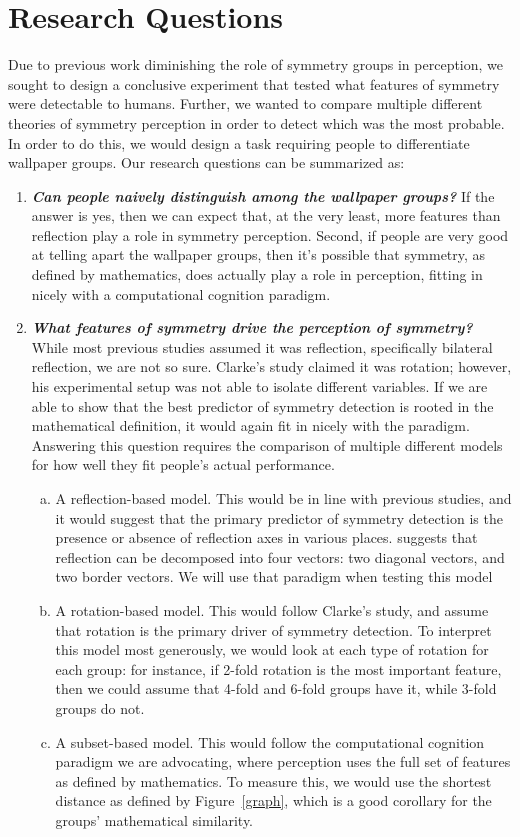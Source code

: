 \section{Research Questions}
Due to previous work diminishing the role of symmetry groups in perception, we sought to design a conclusive experiment that tested what features of symmetry were detectable to humans. Further, we wanted to compare multiple different theories of symmetry perception in order to detect which was the most probable. In order to do this, we would design a task requiring people to differentiate wallpaper groups. Our research questions can be summarized as:

\begin{enumerate}
\item {\textbf{\textit{Can people naively distinguish among the wallpaper groups?}} If the answer is yes, then we can expect that, at the very least, more features than reflection play a role in symmetry perception. Second, if people are very good at telling apart the wallpaper groups, then it's possible that symmetry, as defined by mathematics, does actually play a role in perception, fitting in nicely with a computational cognition paradigm.}
\item {\textbf{\textit{What features of symmetry drive the perception of symmetry?}} While most previous studies assumed it was reflection, specifically bilateral reflection, we are not so sure. Clarke's study claimed it was rotation; however, his experimental setup was not able to isolate different variables. If we are able to show that the best predictor of symmetry detection is rooted in the mathematical definition, it would again fit in nicely with the paradigm. Answering this question requires the comparison of multiple different models for how well they fit people's actual performance.}
\begin{enumerate}[a.]
\item {A reflection-based model. This would be in line with previous studies, and it would suggest that the primary predictor of symmetry detection is the presence or absence of reflection axes in various places. \citet{yanxibook} suggests that reflection can be decomposed into four vectors: two diagonal vectors, and two border vectors. We will use that paradigm when testing this model}
\item {A rotation-based model. This would follow Clarke's study, and assume that rotation is the primary driver of symmetry detection. To interpret this model most generously, we would look at each type of rotation for each group: for instance, if 2-fold rotation is the most important feature, then we could assume that 4-fold and 6-fold groups have it, while 3-fold groups do not.}
\item {A subset-based model. This would follow the computational cognition paradigm we are advocating, where perception uses the full set of features as defined by mathematics. To measure this, we would use the shortest distance as defined by Figure~\ref{graph}, which is a good corollary for the groups' mathematical similarity.}
\end{enumerate}
\end{enumerate}